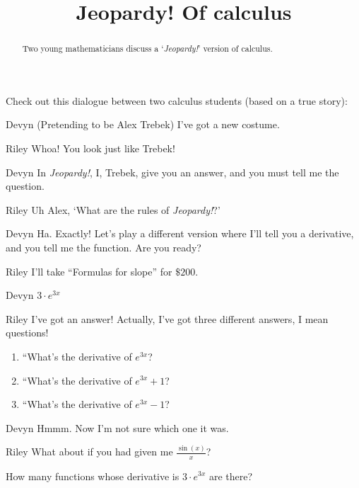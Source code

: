 \documentclass{ximera}
\title[Break-Ground:]{Jeopardy! Of calculus}
\begin{document}
\begin{abstract}
  Two young mathematicians discuss a `\textit{Jeopardy!}' version of calculus.
\end{abstract}
\maketitle

Check out this dialogue between two calculus students (based on a true story):

\begin{dialogue}
\item[Devyn] (Pretending to be Alex Trebek) I've got a new costume.
\item[Riley] Whoa! You look just like Trebek!
\item[Devyn] In \textit{Jeopardy!}, I, Trebek, give you an answer, and you must tell me the question.
\item[Riley] Uh Alex, `What are the rules of \textit{Jeopardy!}?'
\item[Devyn] Ha. Exactly! Let's play a different version where I'll
  tell you a derivative, and you tell me the function.  Are you ready?
\item[Riley] I'll take ``Formulas for slope'' for $\$200$.
\item[Devyn] $3\cdot e^{3x}$  
\item[Riley] I've got an answer!  Actually, I've got three different
  answers, I mean questions!
  \begin{enumerate}
  \item ``What's the derivative of $e^{3x}$?
  \item ``What's the derivative of $e^{3x}+1$?
  \item ``What's the derivative of $e^{3x}-1$?
  \end{enumerate}
\item[Devyn] Hmmm. Now I'm not sure which one it was.
\item[Riley] What about if you had given me $\frac{\sin(x)}{x}$?
\end{dialogue}


\begin{problem}
  How many functions whose derivative is $3\cdot e^{3x}$ are there?
  \begin{prompt}
  \begin{multipleChoice}
  \end{multipleChoice}
  \end{prompt}
\end{problem}
\end{document}
